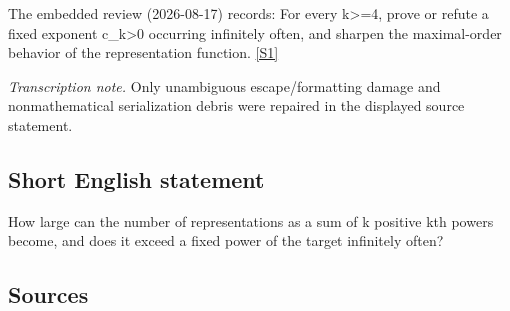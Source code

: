 \documentclass[11pt,a4paper]{article}
\newcommand{\sref}[2]{\hyperlink{source:#1:#2}{[S#2]}}
\begin{document}
The embedded review (2026-08-17) records: For every k>=4, prove or refute a fixed exponent c\_k>0 occurring infinitely often, and sharpen the maximal-order behavior of the representation function. \sref{statement}{1}

{\small\emph{Transcription note.} Only unambiguous escape/formatting damage and nonmathematical serialization debris were repaired in the displayed source statement.}

\subsection{Short English statement}

How large can the number of representations as a sum of k positive kth powers become, and does it exceed a fixed power of the target infinitely often?

\subsection{Sources}
\end{document}
